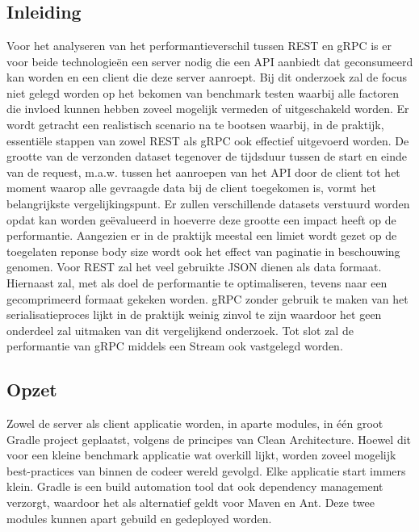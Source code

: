 
\chapter{}%
\label{ch:methodologie}

\section{Inleiding}

Voor het analyseren van het performantieverschil tussen REST en gRPC is er voor beide technologie\"en een server nodig die een API aanbiedt dat geconsumeerd kan worden en
een client die deze server aanroept. Bij dit onderzoek zal de focus niet gelegd worden op het bekomen van benchmark testen waarbij alle factoren die invloed kunnen hebben
zoveel mogelijk vermeden of uitgeschakeld worden. Er wordt getracht een realistisch scenario na te bootsen waarbij, in de praktijk, essenti\"ele stappen van zowel REST als gRPC
ook effectief uitgevoerd worden.
De grootte van de verzonden dataset tegenover de tijdsduur tussen de start en einde van de request, m.a.w. tussen het aanroepen van het API door de client
tot het moment waarop alle gevraagde data bij de client toegekomen is, vormt het belangrijkste vergelijkingspunt.
Er zullen verschillende datasets verstuurd worden opdat kan worden ge\"evalueerd in hoeverre deze grootte een impact heeft op de performantie.
Aangezien er in de praktijk meestal een limiet wordt gezet op de toegelaten reponse body size wordt ook het effect van paginatie in beschouwing genomen.
Voor REST zal het veel gebruikte JSON dienen als data formaat. Hiernaast zal, met als doel de performantie te optimaliseren,
tevens naar een gecomprimeerd formaat gekeken worden. gRPC zonder gebruik te maken van het serialisatieproces lijkt in de praktijk weinig zinvol te zijn waardoor het geen onderdeel
zal uitmaken van dit vergelijkend onderzoek. Tot slot zal de performantie van gRPC middels een Stream ook vastgelegd worden.\\

\section{Opzet}
\label{sec:opzet}

Zowel de server als client applicatie worden, in aparte modules, in \'e\'en groot Gradle project geplaatst, volgens de principes van Clean Architecture. Hoewel dit
voor een kleine benchmark applicatie wat overkill lijkt, worden zoveel mogelijk best-practices van binnen de codeer wereld gevolgd. Elke applicatie start immers klein.
Gradle is een build automation tool dat ook dependency management verzorgt, waardoor het als alternatief geldt voor Maven en Ant.
Deze twee modules kunnen apart gebuild en gedeployed worden.\newline
~\autocite{Gradle}\\

